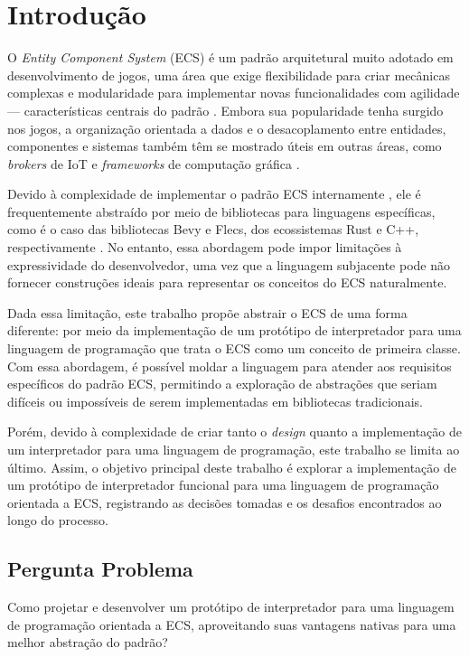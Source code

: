 \chapter{Introdução} \label{ch:introducao}

O \textit{Entity Component System} (ECS) é um padrão arquitetural muito adotado em desenvolvimento de jogos, uma área que exige flexibilidade para criar mecânicas complexas e modularidade para implementar novas funcionalidades com agilidade — características centrais do padrão \cite{ecsfaq}. Embora sua popularidade tenha surgido nos jogos, a organização orientada a dados e o desacoplamento entre entidades, componentes e sistemas também têm se mostrado úteis em outras áreas, como \textit{brokers} de IoT e \textit{frameworks} de computação gráfica \cite{ecsiotbrokers, ecscomputergraphics}.

Devido à complexidade de implementar o padrão ECS internamente \cite{ecsstorageinpics}, ele é frequentemente abstraído por meio de bibliotecas para linguagens específicas, como é o caso das bibliotecas Bevy e Flecs, dos ecossistemas Rust e C++, respectivamente \cite{bevy, flecs}. No entanto, essa abordagem pode impor limitações à expressividade do desenvolvedor, uma vez que a linguagem subjacente pode não fornecer construções ideais para representar os conceitos do ECS naturalmente.

Dada essa limitação, este trabalho propõe abstrair o ECS de uma forma diferente: por meio da implementação de um protótipo de interpretador para uma linguagem de programação que trata o ECS como um conceito de primeira classe. Com essa abordagem, é possível moldar a linguagem para atender aos requisitos específicos do padrão ECS, permitindo a exploração de abstrações que seriam difíceis ou impossíveis de serem implementadas em bibliotecas tradicionais.

Porém, devido à complexidade de criar tanto o \textit{design} quanto a implementação de um interpretador para uma linguagem de programação, este trabalho se limita ao último. Assim, o objetivo principal deste trabalho é explorar a implementação de um protótipo de interpretador funcional para uma linguagem de programação orientada a ECS, registrando as decisões tomadas e os desafios encontrados ao longo do processo.

\section{Pergunta Problema}

Como projetar e desenvolver um protótipo de interpretador para uma linguagem de programação orientada a ECS, aproveitando suas vantagens nativas para uma melhor abstração do padrão?

